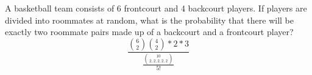 \item A basketball team consists of 6 frontcourt and 4 backcourt players. If players are divided into roommates at random, what is the probability that there will be exactly two roommate pairs made up of a backcourt and a frontcourt player?
\[ \frac{\binom{6}{2} \binom{4}{2} * 2 * 3}{\frac{\binom{10}{2,2,2,2,2}}{5!}} \]